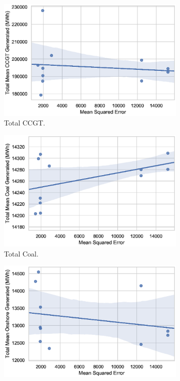 \documentclass[final,3p,times,twocolumn,numbers]{elsarticle}
\begin{document}
\begin{figure}[h!]
\centering
\begin{subfigure}[b]{0.3\textwidth}
\includegraphics[width=\columnwidth]{figures/results/elecsim_results/results_2/total_CCGT_mean_output.eps}
\caption{Total CCGT.}
\label{fig:total_CCGT_mean_output}
\end{subfigure}
\hfil
\begin{subfigure}[b]{0.3\textwidth}  
\includegraphics[width=\columnwidth]{figures/results/elecsim_results/results_2/total_Coal_mean_output.eps}
\caption{Total Coal.}
\label{fig:total_Coal_mean_output}
\end{subfigure}
\hfil
\begin{subfigure}[b]{0.3\textwidth}   
\includegraphics[width=\columnwidth]{figures/results/elecsim_results/results_2/total_Onshore_mean_output.eps}

\end{subfigure}
\end{figure}
\end{document}
